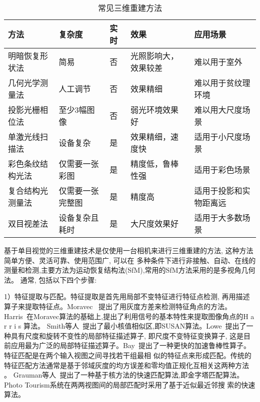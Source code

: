 \begin{table}[h]
  \centering
  \caption{常见三维重建方法}
  \label{tab:3Dconstruction}
  \begin{tabular}{C{3.4cm}C{1.6cm}C{0.8cm}C{3.4cm}C{3.4cm}}
  \toprule
  \textbf{方法} & \textbf{复杂度} & \textbf{实时} & \textbf{效果}& \textbf{应用场景} \\
  \midrule
  明暗恢复形状法\cite{nayar1994shape}    & 简易   &否 & 光照影响大，效果较差 &难以用于室外           \\
  几何光学测量法\cite{choi1999three}    & 人工调节   &否 &效果精细 &难以用于贫纹理环境           \\
  投影光栅相位法\cite{srinivasan1984automated,颜国霖2010基于光栅相位法三维重构技术研究}    & 至少3幅图像   &否 & 弱光环境效果好 &难以用大尺度场景          \\
  单激光线扫描法\cite{黄俊春2009基于彩色结构光的实时三维重建}    & 设备复杂   &是 &效果精细，速度快 &适用于小尺度场景           \\
  彩色条纹结构光法\cite{izquierdo1999sub}    & 仅需要一张彩图   &是 &精度低，鲁棒性强 &适用于彩色场景           \\
  复合结构光测量法\cite{takeda1983fourier}    &仅需要一张完整图 &是 & 精度高 &适用于投影和实物距离远           \\
  双目视差法\cite{黄俊春2009基于彩色结构光的实时三维重建}    & 设备复杂且耗时   &是 &大尺度效果好&适用于大多数场景           \\
  \bottomrule
  \end{tabular}
\end{table}


基于单目视觉的三维重建技术是仅使用一台相机来进行三维重建的方法, 这种方法简单方便、灵活可靠、使用范围广, 可以在
多种条件下进行非接触、自动、在线的测量和检测,主要方法为运动恢复结构法(SfM),常用的SfM方法采用的是多视角几何法。
通常, 包括以下四个步骤: 

1）特征提取与匹配。特征提取是首先用局部不变特征进行特征点检测, 再用描述算子来提取特征点。Moravec~\cite{moravec1977techniques}
提出了用灰度方差来检测特征角点的方法。Harris~\cite{harris1988combined}在Moravec算法的基础上,提出了利用信号的基本特性来提取图像角点的H a r r i s 算法。
Smith等人~\cite{smith1997susan}提出了最小核值相似区,即SUSAN算法。Lowe~\cite{lowe2004distinctive}提出了一种具有尺度和旋转不变性的局部特征描述算子,
即尺度不变特征变换算子, 这是目前应用最为广泛的局部特征描述算子。Bay~\cite{bay2008speeded}提出了一种更快的加速鲁棒性算子。特征匹配是在两个输入视图之间寻找若干组最相
似的特征点来形成匹配。传统的特征匹配方法通常是基于邻域灰度的均方误差和零均值正规化互相关这两种方法 。
Grauman等人~\cite{grauman2007pyramid}提出了一种基于核方法的快速匹配算法,即金字塔匹配算法。Photo Tourism系统在两两视图间的局部匹配时采用了基于近似最近邻搜
索\cite{mount1998ann}的快速算法。

